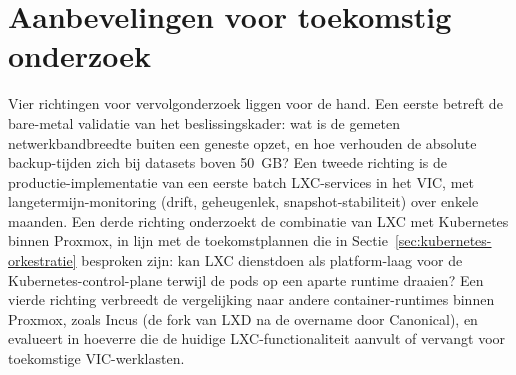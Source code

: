 \section{Aanbevelingen voor toekomstig onderzoek}

Vier richtingen voor vervolgonderzoek liggen voor de hand. Een eerste betreft de bare-metal validatie van het beslissingskader: wat is de gemeten netwerkbandbreedte buiten een geneste opzet, en hoe verhouden de absolute backup-tijden zich bij datasets boven 50~GB? Een tweede richting is de productie-implementatie van een eerste batch LXC-services in het VIC, met langetermijn-monitoring (drift, geheugenlek, snapshot-stabiliteit) over enkele maanden. Een derde richting onderzoekt de combinatie van LXC met Kubernetes binnen Proxmox, in lijn met de toekomstplannen die in Sectie~\ref{sec:kubernetes-orkestratie} besproken zijn: kan LXC dienstdoen als platform-laag voor de Kubernetes-control-plane terwijl de pods op een aparte runtime draaien? Een vierde richting verbreedt de vergelijking naar andere container-runtimes binnen Proxmox, zoals Incus (de fork van LXD na de overname door Canonical), en evalueert in hoeverre die de huidige LXC-functionaliteit aanvult of vervangt voor toekomstige VIC-werklasten.
